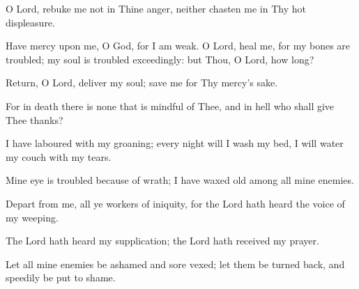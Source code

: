 O Lord, rebuke me not in Thine anger, neither chasten me in Thy hot displeasure.

Have mercy upon me, O God, for I am weak. O Lord, heal me, for my bones are troubled; my soul is troubled exceedingly: but Thou, O Lord, how long?

Return, O Lord, deliver my soul; save me for Thy mercy's sake.

For in death there is none that is mindful of Thee, and in hell who shall give Thee thanks?

I have laboured with my groaning; every night will I wash my bed, I will water my couch with my tears.

Mine eye is troubled because of wrath; I have waxed old among all mine enemies.

Depart from me, all ye workers of iniquity, for the Lord hath heard the voice of my weeping.

The Lord hath heard my supplication; the Lord hath received my prayer.

Let all mine enemies be ashamed and sore vexed; let them be turned back, and speedily be put to shame.
